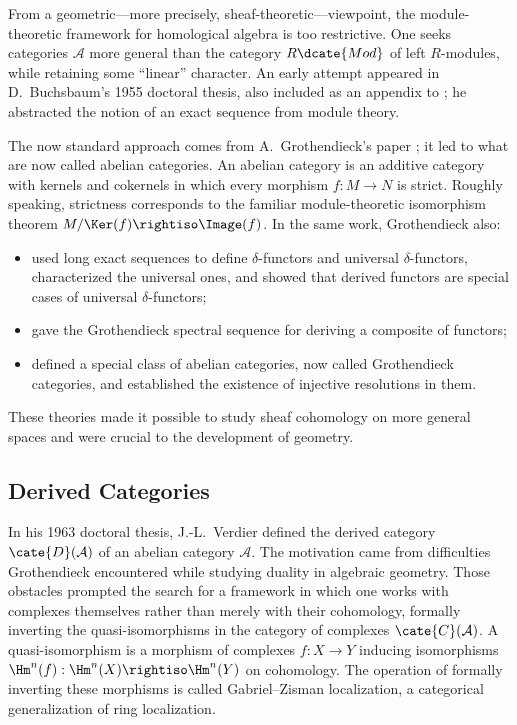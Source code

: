 From a geometric---more precisely, sheaf-theoretic---viewpoint, the module-theoretic framework for homological algebra is too restrictive. One seeks categories $\mathcal A$ more general than the category $R\dcate{Mod}$ of left $R$-modules, while retaining some ``linear'' character. An early attempt appeared in D.\ Buchsbaum's 1955 doctoral thesis, also included as an appendix to \cite{CE56}; he abstracted the notion of an exact sequence from module theory.

The now standard approach comes from A.\ Grothendieck's paper \cite{Gr57}; it led to what are now called abelian categories. An abelian category is an additive category with kernels and cokernels in which every morphism $f:M\to N$ is strict. Roughly speaking, strictness corresponds to the familiar module-theoretic isomorphism theorem $M/\Ker(f)\rightiso\Image(f)$. In the same work, Grothendieck also:
\begin{itemize}
	\item used long exact sequences to define $\delta$-functors and universal $\delta$-functors, characterized the universal ones, and showed that derived functors are special cases of universal $\delta$-functors;
	\item gave the Grothendieck spectral sequence for deriving a composite of functors;
	\item defined a special class of abelian categories, now called Grothendieck categories, and established the existence of injective resolutions in them.
\end{itemize}

These theories made it possible to study sheaf cohomology on more general spaces and were crucial to the development of geometry.

\subsection*{Derived Categories}

In his 1963 doctoral thesis, J.-L.\ Verdier defined the derived category $\cate{D}(\mathcal A)$ of an abelian category $\mathcal A$. The motivation came from difficulties Grothendieck encountered while studying duality in algebraic geometry. Those obstacles prompted the search for a framework in which one works with complexes themselves rather than merely with their cohomology, formally inverting the quasi-isomorphisms in the category of complexes $\cate{C}(\mathcal A)$. A quasi-isomorphism is a morphism of complexes $f:X\to Y$ inducing isomorphisms $\Hm^n(f):\Hm^n(X)\rightiso\Hm^n(Y)$ on cohomology. The operation of formally inverting these morphisms is called Gabriel--Zisman localization, a categorical generalization of ring localization.

